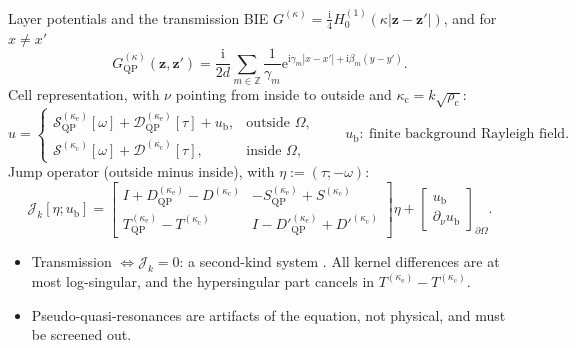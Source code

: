 \documentclass[aspectratio=169]{beamer}
\newcommand{\ii}{\mathrm{i}}
\newcommand{\ee}{\mathrm{e}}
\newcommand{\ZZ}{\mathbb{Z}}
\newcommand{\QP}{\mathrm{QP}}
\begin{document}
\begin{frame}{Layer potentials and the transmission BIE}
  \footnotesize
  $G^{(\kappa)}=\tfrac{\ii}{4}H_0^{(1)}(\kappa|\mathbf z-\mathbf z'|)$, and for $x\neq x'$
  \cite{Linton1998}
  \[
    G^{(\kappa)}_\QP(\mathbf z,\mathbf z')=\frac{\ii}{2d}\sum_{m\in\ZZ}\frac1{\gamma_m}
    \ee^{\ii\gamma_m|x-x'|+\ii\beta_m(y-y')}.
  \]
  Cell representation, with $\nu$ pointing from inside to outside and
  $\kappa_{\mathrm c}=k\sqrt{\rho_{\mathrm c}}$:
  \[
    u=\begin{cases}
      \mathcal S^{(\kappa_{\mathrm e})}_\QP[\omega]+\mathcal D^{(\kappa_{\mathrm e})}_\QP[\tau]+u_{\mathrm b},
        & \text{outside }\Omega,\\[0.2em]
      \mathcal S^{(\kappa_{\mathrm c})}[\omega]+\mathcal D^{(\kappa_{\mathrm c})}[\tau], & \text{inside }\Omega,
    \end{cases}
    \qquad u_{\mathrm b}:\ \text{finite background Rayleigh field}.
  \]
  Jump operator (outside minus inside), with $\eta:=(\tau;-\omega)$:
  \[
    \mathscr J_k[\eta;u_{\mathrm b}]
    =\begin{bmatrix}
      I+D^{(\kappa_{\mathrm e})}_\QP-D^{(\kappa_{\mathrm c})} & -S^{(\kappa_{\mathrm e})}_\QP+S^{(\kappa_{\mathrm c})}\\
      T^{(\kappa_{\mathrm e})}_\QP-T^{(\kappa_{\mathrm c})} & I-D'^{(\kappa_{\mathrm e})}_\QP+D'^{(\kappa_{\mathrm c})}
    \end{bmatrix}\eta
    +\begin{bmatrix}u_{\mathrm b}\\ \partial_\nu u_{\mathrm b}\end{bmatrix}_{\partial\Omega}.
  \]
  \begin{itemize}
    \item Transmission $\Leftrightarrow\mathscr J_k=0$: a second-kind system
      \cite{DominguezLyonTurc2016}. All kernel differences are at most log-singular,
      and the hypersingular part cancels in $T^{(\kappa_{\mathrm e})}-T^{(\kappa_{\mathrm c})}$.
    \item Pseudo-quasi-resonances \cite{HiptmairMoiolaSpence2022} are artifacts of the
      equation, not physical, and must be screened out.
  \end{itemize}
\end{frame}
\end{document}
